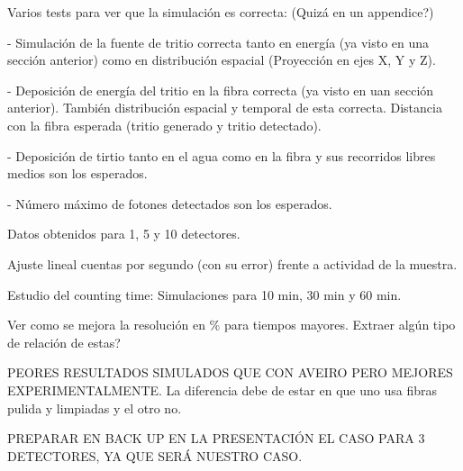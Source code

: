 Varios tests para ver que la simulación es correcta: (Quizá en un appendice?)

- Simulación de la fuente de tritio correcta tanto en energía (ya visto en una sección anterior) como en distribución espacial (Proyección en ejes X, Y y Z).

- Deposición de energía del tritio en la fibra correcta (ya visto en uan sección anterior). También distribución espacial y temporal de esta correcta. Distancia con la fibra esperada (tritio generado y tritio detectado).

- Deposición de tirtio tanto en el agua como en la fibra y sus recorridos libres medios son los esperados.

- Número máximo de fotones detectados son los esperados.

Datos obtenidos para 1, 5 y 10 detectores.

Ajuste lineal cuentas por segundo (con su error) frente a actividad de la muestra.

Estudio del counting time: Simulaciones para 10 min, 30 min y 60 min.

Ver como se mejora la resolución en \% para tiempos mayores. Extraer algún tipo de relación de estas?

PEORES RESULTADOS SIMULADOS QUE CON AVEIRO PERO MEJORES EXPERIMENTALMENTE. La diferencia debe de estar en que uno usa fibras pulida y limpiadas y el otro no.

PREPARAR EN BACK UP EN LA PRESENTACIÓN EL CASO PARA 3 DETECTORES, YA QUE SERÁ NUESTRO CASO.
